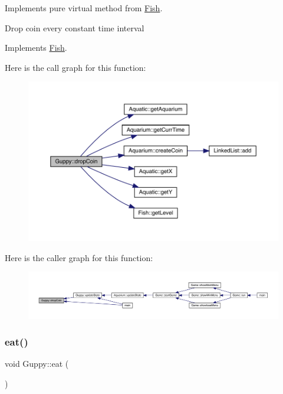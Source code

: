 Implements pure virtual method from \mbox{\hyperlink{class_fish}{Fish}}. 

Drop coin every constant time interval 

Implements \mbox{\hyperlink{class_fish_a899c7712639756297b9205e8bbcc2cf6}{Fish}}.

Here is the call graph for this function\+:\nopagebreak
\begin{figure}[H]
\begin{center}
\leavevmode
\includegraphics[width=350pt]{class_guppy_a356d1f45f52684bba3e6e9e7774e59b8_cgraph}
\end{center}
\end{figure}
Here is the caller graph for this function\+:
\nopagebreak
\begin{figure}[H]
\begin{center}
\leavevmode
\includegraphics[width=350pt]{class_guppy_a356d1f45f52684bba3e6e9e7774e59b8_icgraph}
\end{center}
\end{figure}
\mbox{\label{class_guppy_afe934262a0988e4ad041f4ed3a1a7e02}} 
\subsubsection{\texorpdfstring{eat()}{eat()}}
{\footnotesize\ttfamily void Guppy\+::eat (\begin{DoxyParamCaption}{ }\end{DoxyParamCaption})\hspace{0.3cm}{\ttfamily [virtual]}}



